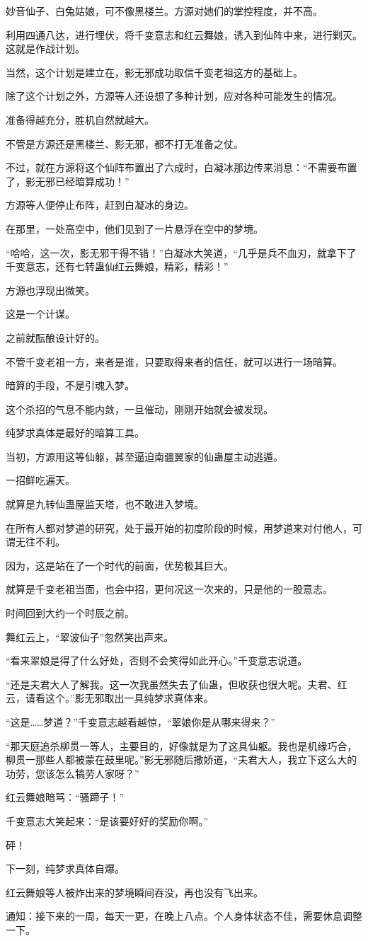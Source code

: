 \begin{this_body}
妙音仙子、白兔姑娘，可不像黑楼兰。方源对她们的掌控程度，并不高。

利用四通八达，进行埋伏，将千变意志和红云舞娘，诱入到仙阵中来，进行剿灭。这就是作战计划。

当然，这个计划是建立在，影无邪成功取信千变老祖这方的基础上。

除了这个计划之外，方源等人还设想了多种计划，应对各种可能发生的情况。

准备得越充分，胜机自然就越大。

不管是方源还是黑楼兰、影无邪，都不打无准备之仗。

不过，就在方源将这个仙阵布置出了六成时，白凝冰那边传来消息：“不需要布置了，影无邪已经暗算成功！”

方源等人便停止布阵，赶到白凝冰的身边。

在那里，一处高空中，他们见到了一片悬浮在空中的梦境。

“哈哈，这一次，影无邪干得不错！”白凝冰大笑道，“几乎是兵不血刃，就拿下了千变意志，还有七转蛊仙红云舞娘，精彩，精彩！”

方源也浮现出微笑。

这是一个计谋。

之前就酝酿设计好的。

不管千变老祖一方，来者是谁，只要取得来者的信任，就可以进行一场暗算。

暗算的手段，不是引魂入梦。

这个杀招的气息不能内敛，一旦催动，刚刚开始就会被发现。

纯梦求真体是最好的暗算工具。

当初，方源用这等仙躯，甚至逼迫南疆翼家的仙蛊屋主动逃遁。

一招鲜吃遍天。

就算是九转仙蛊屋监天塔，也不敢进入梦境。

在所有人都对梦道的研究，处于最开始的初度阶段的时候，用梦道来对付他人，可谓无往不利。

因为，这是站在了一个时代的前面，优势极其巨大。

就算是千变老祖当面，也会中招，更何况这一次来的，只是他的一股意志。

时间回到大约一个时辰之前。

舞红云上，“翠波仙子”忽然笑出声来。

“看来翠娘是得了什么好处，否则不会笑得如此开心。”千变意志说道。

“还是夫君大人了解我。这一次我虽然失去了仙蛊，但收获也很大呢。夫君、红云，请看这个。”影无邪取出一具纯梦求真体来。

“这是……梦道？”千变意志越看越惊，“翠娘你是从哪来得来？”

“那天庭追杀柳贯一等人，主要目的，好像就是为了这具仙躯。我也是机缘巧合，柳贯一那些人都被蒙在鼓里呢。”影无邪随后撒娇道，“夫君大人，我立下这么大的功劳，您该怎么犒劳人家呀？”

红云舞娘暗骂：“骚蹄子！”

千变意志大笑起来：“是该要好好的奖励你啊。”

砰！

下一刻，纯梦求真体自爆。

红云舞娘等人被炸出来的梦境瞬间吞没，再也没有飞出来。

通知：接下来的一周，每天一更，在晚上八点。个人身体状态不佳，需要休息调整一下。

\end{this_body}

